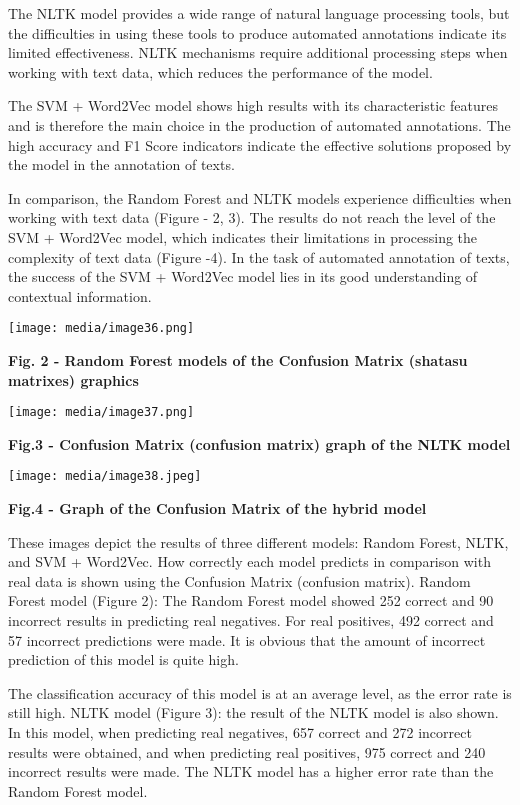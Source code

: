 \documentclass[
]{article}
\begin{document}
The NLTK model provides a wide range of natural language processing
tools, but the difficulties in using these tools to produce automated
annotations indicate its limited effectiveness. NLTK mechanisms require
additional processing steps when working with text data, which reduces
the performance of the model.

The SVM + Word2Vec model shows high results with its characteristic
features and is therefore the main choice in the production of automated
annotations. The high accuracy and F1 Score indicators indicate the
effective solutions proposed by the model in the annotation of texts.

In comparison, the Random Forest and NLTK models experience difficulties
when working with text data (Figure - 2, 3). The results do not reach
the level of the SVM + Word2Vec model, which indicates their limitations
in processing the complexity of text data (Figure -4). In the task of
automated annotation of texts, the success of the SVM + Word2Vec model
lies in its good understanding of contextual information.

\texttt{[image: media/image36.png]}

\textbf{Fig. 2 - Random Forest models of the Confusion Matrix (shatasu
matrixes) graphics}

\texttt{[image: media/image37.png]}

\textbf{Fig.3 - Confusion Matrix (confusion matrix) graph of the NLTK
model}

\texttt{[image: media/image38.jpeg]}

\textbf{Fig.4 - Graph of the Confusion Matrix of the hybrid model}

These images depict the results of three different models: Random
Forest, NLTK, and SVM + Word2Vec. How correctly each model predicts in
comparison with real data is shown using the Confusion Matrix (confusion
matrix). Random Forest model (Figure 2): The Random Forest model showed
252 correct and 90 incorrect results in predicting real negatives. For
real positives, 492 correct and 57 incorrect predictions were made. It
is obvious that the amount of incorrect prediction of this model is
quite high.

The classification accuracy of this model is at an average level, as the
error rate is still high. NLTK model (Figure 3): the result of the NLTK
model is also shown. In this model, when predicting real negatives, 657
correct and 272 incorrect results were obtained, and when predicting
real positives, 975 correct and 240 incorrect results were made. The
NLTK model has a higher error rate than the Random Forest model.
\end{document}
